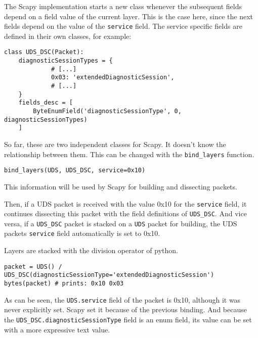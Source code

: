 The Scapy implementation starts a new class whenever the subsequent fields depend on a field value of the current layer. This is the case here, since the next fields depend on the value of the \texttt{service} field. The service specific fields are defined in their own classes, for example:

\begin{samepage}
\begin{verbatim}
class UDS_DSC(Packet):
    diagnosticSessionTypes = {
             # [...]
             0x03: 'extendedDiagnosticSession',
             # [...]
    }
    fields_desc = [
        ByteEnumField('diagnosticSessionType', 0,  diagnosticSessionTypes)
    ]
\end{verbatim}
\end{samepage}

So far, these are two independent classes for Scapy. It doesn't know the relationship between them. This can be changed with the \texttt{bind_layers} function.

\begin{verbatim}
bind_layers(UDS, UDS_DSC, service=0x10)
\end{verbatim}

This information will be used by Scapy for building and dissecting packets.

Then, if a UDS packet is received with the value 0x10 for the \texttt{service} field, it continues dissecting this packet with the field definitions of \texttt{UDS_DSC}. And vice versa, if a \texttt{UDS_DSC} packet is stacked on a \texttt{UDS} packet for building, the UDS packets \texttt{service} field automatically is set to 0x10.

Layers are stacked with the division operator of python.

\begin{samepage}
\begin{verbatim}
packet = UDS() / UDS_DSC(diagnosticSessionType='extendedDiagnosticSession')
bytes(packet) # prints: 0x10 0x03
\end{verbatim}
\end{samepage}

As can be seen, the \texttt{UDS.service} field of the packet is 0x10, although it was never explicitly set. Scapy set it because of the previous binding. And because the \texttt{UDS_DSC.diagnosticSessionType} field is an enum field, its value can be set with a more expressive text value.


